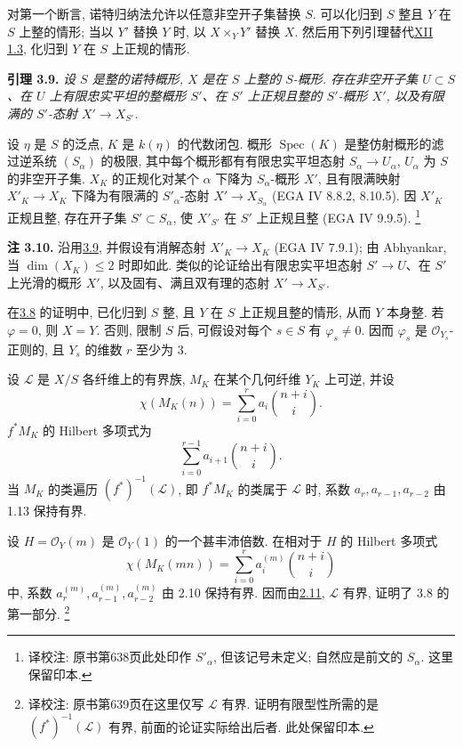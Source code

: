 对第一个断言, 诺特归纳法允许以任意非空开子集替换 \(S\). 可以化归到 \(S\) 整且 \(Y\) 在 \(S\) 上整的情形; 当以 \(Y'\) 替换 \(Y\) 时, 以 \(X\times_Y Y'\) 替换 \(X\). 然后用下列引理替代\hyperlink{sga6.e12.lem.1-3}{XII 1.3}, 化归到 \(Y\) 在 \(S\) 上正规的情形.

\textbf{引理 3.9.} \emph{设 \(S\) 是整的诺特概形, \(X\) 是在 \(S\) 上整的 \(S\)-概形. 存在非空开子集 \(U\subset S\)、在 \(U\) 上有限忠实平坦的整概形 \(S'\)、在 \(S'\) 上正规且整的 \(S'\)-概形 \(X'\), 以及有限满的 \(S'\)-态射 \(X'\to X_{S'}\).}

设 \(\eta\) 是 \(S\) 的泛点, \(K\) 是 \(k(\eta)\) 的代数闭包. 概形 \(\operatorname{Spec}(K)\) 是整仿射概形的滤过逆系统 \((S_\alpha)\) 的极限, 其中每个概形都有有限忠实平坦态射 \(S_\alpha\to U_\alpha\), \(U_\alpha\) 为 \(S\) 的非空开子集. \(X_K\) 的正规化对某个 \(\alpha\) 下降为 \(S_\alpha\)-概形 \(X'\), 且有限满映射 \(X'_K\to X_K\) 下降为有限满的 \(S'_\alpha\)-态射 \(X'\to X_{S_\alpha}\) (EGA IV 8.8.2, 8.10.5). 因 \(X'_K\) 正规且整, 存在开子集 \(S'\subset S_\alpha\), 使 \(X'_{S'}\) 在 \(S'\) 上正规且整 (EGA IV 9.9.5).
\footnote{译校注: 原书第638页此处印作 $S'_\alpha$, 但该记号未定义; 自然应是前文的 $S_\alpha$. 这里保留印本.}

\textbf{注 3.10.} 沿用\hyperlink{sga6.e13.lem.3-9}{3.9}, 并假设有消解态射 \(X'_K\to X_K\) (EGA IV 7.9.1); 由 Abhyankar, 当 \(\dim(X_K)\le2\) 时即如此. 类似的论证给出有限忠实平坦态射 \(S'\to U\)、在 \(S'\) 上光滑的概形 \(X'\), 以及固有、满且双有理的态射 \(X'\to X_{S'}\).

在\hyperlink{sga6.e13.thm.3-8}{3.8} 的证明中, 已化归到 \(S\) 整, 且 \(Y\) 在 \(S\) 上正规且整的情形, 从而 \(Y\) 本身整. 若 \(\varphi=0\), 则 \(X=Y\). 否则, 限制 \(S\) 后, 可假设对每个 \(s\in S\) 有 \(\varphi_s\ne0\). 因而 \(\varphi_s\) 是 \(\mathcal O_{Y_s}\)-正则的, 且 \(Y_s\) 的维数 \(r\) 至少为 \(3\).

设 \(\mathscr L\) 是 \(X/S\) 各纤维上的有界族, \(M_K\) 在某个几何纤维 \(Y_K\) 上可逆, 并设
\[
\chi(M_K(n))=\sum_{i=0}^{r}a_i\binom{n+i}{i}.
\]
\(f^*M_K\) 的 Hilbert 多项式为
\[
\sum_{i=0}^{r-1}a_{i+1}\binom{n+i}{i}.
\]
当 \(M_K\) 的类遍历 \((f^*)^{-1}(\mathscr L)\), 即 \(f^*M_K\) 的类属于 \(\mathscr L\) 时, 系数 \(a_r,a_{r-1},a_{r-2}\) 由 1.13 保持有界.

设 \(H=\mathcal O_Y(m)\) 是 \(\mathcal O_Y(1)\) 的一个甚丰沛倍数. 在相对于 \(H\) 的 Hilbert 多项式
\[
\chi(M_K(mn))=\sum_{i=0}^{r}a_i^{(m)}\binom{n+i}{i}
\]
中, 系数 \(a_r^{(m)},a_{r-1}^{(m)},a_{r-2}^{(m)}\) 由 2.10 保持有界. 因而由\hyperlink{sga6.e13.lem.2-11}{2.11}, \(\mathscr L\) 有界, 证明了 3.8 的第一部分.
\footnote{译校注: 原书第639页在这里仅写 $\mathscr L$ 有界. 证明有限型性所需的是 $(f^*)^{-1}(\mathscr L)$ 有界, 前面的论证实际给出后者. 此处保留印本.}

